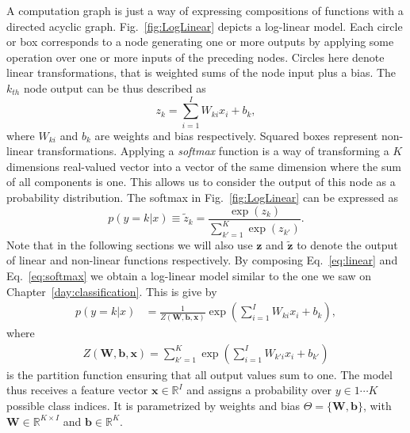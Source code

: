 A computation graph is just a way of expressing compositions of functions with
a directed acyclic graph. Fig.~\ref{fig:LogLinear} depicts a log-linear model.
Each circle or box corresponds to a node generating one or more outputs by
applying some operation over one or more inputs of the preceding nodes. Circles
here denote linear transformations, that is weighted sums of the node input
plus a bias. The $k_{th}$ node output can be thus described as
%
\begin{equation}
    z_k = \sum_{i=1}^{I} W_{ki} x_i + b_k,
\label{eq:linear}
\end{equation}
%
where $W_{ki}$ and $b_k$ are weights and bias respectively. Squared boxes
represent non-linear transformations. Applying a \textit{softmax} function is a
way of transforming a $K$ dimensions real-valued vector into a vector of the
same dimension where the sum of all components is one. This allows us to
consider the output of this node as a probability distribution. The softmax in
Fig.~\ref{fig:LogLinear} can be expressed as
%
\begin{equation}
p(y=k|{x}) \equiv \tilde{z}_k = \frac{\exp(z_k)}{\sum_{k'=1}^{K} \exp(z_{k'})}.
\label{eq:softmax}
\end{equation}
%
Note that in the following sections we will also use $\mathbf{z}$ and
$\tilde{\mathbf{z}}$ to denote the output of linear and non-linear functions
respectively. By composing Eq.~\ref{eq:linear} and Eq.~\ref{eq:softmax} we
obtain a log-linear model similar to the one we saw on
Chapter~\ref{day:classification}\footnotemark{}. This is give by
%
\begin{align}
p(y=k|{x}) & = \frac{1}{Z(\mathbf{W},\mathbf{b},\mathbf{x})}\exp\left(\sum_{i=1}^{I} W_{ki} x_i + b_k\right),
\label{eq:loglineargen}
\end{align}
%
\noindent where
\begin{align}
Z(\mathbf{W},\mathbf{b},\mathbf{x}) = \sum_{k'=1}^{K} \exp\left(\sum_{i=1}^{I} W_{k'i} x_i + b_{k'}\right)
\label{eq:loglineargenPartition}
\end{align}
%
is the partition function ensuring that all output values sum to one. The model thus receives a feature vector
$\mathbf{x} \in \mathbb{R}^{I}$ and assigns a probability over $y \in {1 \cdots K}$ possible
class indices. It is parametrized by weights and bias $\Theta=\{\mathbf{W},
\mathbf{b}\}$, with $\mathbf{W} \in \mathbb{R}^{K \times I}$ and $\mathbf{b}
\in \mathbb{R}^{K}$.

